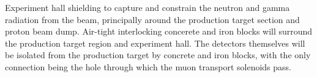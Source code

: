 {}
{}
{\phaseI}
{Experiment hall shielding to capture and constrain the neutron and gamma radiation from the beam, principally around the production target section and proton beam dump.
  Air-tight interlocking concerete and iron blocks will surround the production target region and experiment hall.
  The detectors themselves will be isolated from the production target by concrete and iron blocks, with the only connection being the hole through which the muon transport solenoids pass.
 }
{}
